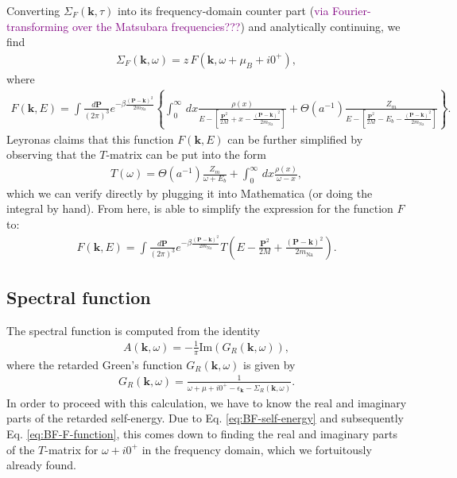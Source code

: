 \documentclass{article}
\theoremstyle{definition}
\newcommand{\f}[2]{\frac{#1}{#2}}
\begin{document}
\noindent Converting $\Sigma_F(\mathbf{k}, \tau)$ into its frequency-domain counter part (\textcolor{purple}{via Fourier-transforming over the Matsubara frequencies???}) and analytically continuing, we find 
\begin{align}\label{eq:BF-self-energy}
\Sigma_F(\mathbf{k}, \omega) =  z \, F(\mathbf{k}, \omega + \mu_B + i0^+),
\end{align}
where
\begin{align}
F(\mathbf{k}, E) = \int \frac{d\mathbf{P}}{(2\pi)^3} e^{-\beta  \frac{(\mathbf{P}- \mathbf{k})^2}{2m_\text{Na}}}
\left\{
\int_0^\infty \,dx \frac{\rho(x)}{E - \left[ \frac{\mathbf{P}^2}{2M} + x - \frac{(\mathbf{P} - \mathbf{k})^2}{2m_\text{Na}} \right]}
+
\Theta(a^{-1})\frac{Z_m}{E - \left[ \frac{\mathbf{P}^2}{2M} - E_b - \frac{(\mathbf{P} - \mathbf{k})^2}{2m_\text{Na}}\right]}
\right\}.
\end{align}
Leyronas claims that this function $F(\mathbf{k}, E)$ can be further simplified by observing that the $T$-matrix can be put into the form
\begin{align}
T(\omega) = \Theta(a^{-1}) \frac{Z_m}{\omega + E_b} + \int_0^\infty \,dx \frac{\rho(x)}{\omega - x},
\end{align}
which we can verify directly by plugging it into Mathematica (or doing the integral by hand). From here, \cite{sun2015high} is able to simplify the expression for the function $F$ to:
\begin{align}\label{eq:BF-F-function}
F(\mathbf{k}, E) = \int \frac{d\mathbf{P}}{(2\pi)^3} e^{-\beta \frac{(\mathbf{P} - \mathbf{k})^2}{2m_\text{Na}}} T\left( E - \frac{\mathbf{P}^2}{2M} + \frac{(\mathbf{P} - \mathbf{k})^2}{2m_\text{Na}} \right).
\end{align}


\subsection{Spectral function}

The spectral function is computed from the identity
\begin{align}
A(\mathbf{k}, \omega) = -\f{1}{\pi}\text{Im}(G_R(\mathbf{k}, \omega)),
\end{align}
where the retarded Green's function $G_R(\mathbf{k}, \omega)$ is given by 
\begin{align}
G_R(\mathbf{k}, \omega) = \f{1}{\omega + \mu + i0^+ - \epsilon_\mathbf{k} - \Sigma_R(\mathbf{k}, \omega)}.
\end{align}
In order to proceed with this calculation, we have to know the real and imaginary parts of the retarded self-energy. Due to  Eq. \eqref{eq:BF-self-energy} and subsequently Eq. \eqref{eq:BF-F-function}, this comes down to finding the real and imaginary parts of the $T$-matrix for $\omega + i0^+$ in the frequency domain, which we fortuitously already found.\\
\end{document}
